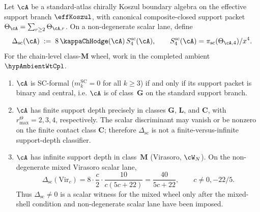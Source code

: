 \begin{proposition}%
\label{prop:formality-depth-discriminant}%
%
%
%
Let\/ $\cA$ be a standard-atlas chirally Koszul boundary algebra on the
effective support branch \(\effKoszul\), with canonical
composite-closed support packet
\(\Theta_\cA=\sum_{r\ge2}\Theta_{\cA,r}\).  On a non-degenerate scalar
lane, define
\[
\Delta_{\mathrm{sc}}(\cA)
\;:=\;
8\,\kappaChHodge(\cA)\,S^{\mathrm{sc}}_4(\cA),
\qquad
S^{\mathrm{sc}}_4(\cA)
=\pi_{\mathrm{sc}}(\Theta_{\cA,4})/x^4 .
\]
For the chain-level class-\(\mathbf M\) wheel, work in the completed
ambient \(\hypAmbientWtCpl\).
\begin{enumerate}
\item\label{item:fdd-sc-formal}
 \(\cA\) is SC-formal \textup{(}\(m_k^{\mathrm{SC}}=0\) for
 all \(k\ge3\)\textup{)} if and only if its support packet is binary
 and central, i.e. \(\cA\) is of class~\(\mathbf G\) on the standard
 support branch.
\item\label{item:fdd-finite-depth}
 \(\cA\) has finite support depth precisely in classes
 \(\mathbf G\), \(\mathbf L\), and \(\mathbf C\), with
 \(r^\Theta_{\max}=2,3,4\), respectively.  The scalar discriminant
 may vanish or be nonzero on the finite contact class
 \(\mathbf C\); therefore \(\Delta_{\mathrm{sc}}\) is not a
 finite-versus-infinite support-depth classifier.
\item\label{item:fdd-infinite-depth}
 \(\cA\) has infinite support depth in class~\(\mathbf M\)
 \textup{(}Virasoro, \(\cW_N\)\textup{)}.  On the non-degenerate
 mixed Virasoro scalar lane,
 \[
 \Delta_{\mathrm{sc}}(\mathrm{Vir}_c)
 =
 8\cdot \frac{c}{2}\cdot \frac{10}{c(5c+22)}
 =
 \frac{40}{5c+22},
 \qquad c\ne0,-22/5 .
 \]
 Thus \(\Delta_{\mathrm{sc}}\ne0\) is a scalar witness for the mixed
 wheel only after the mixed-shell condition and non-degenerate scalar
 lane have been imposed.
\end{enumerate}
\end{proposition}

